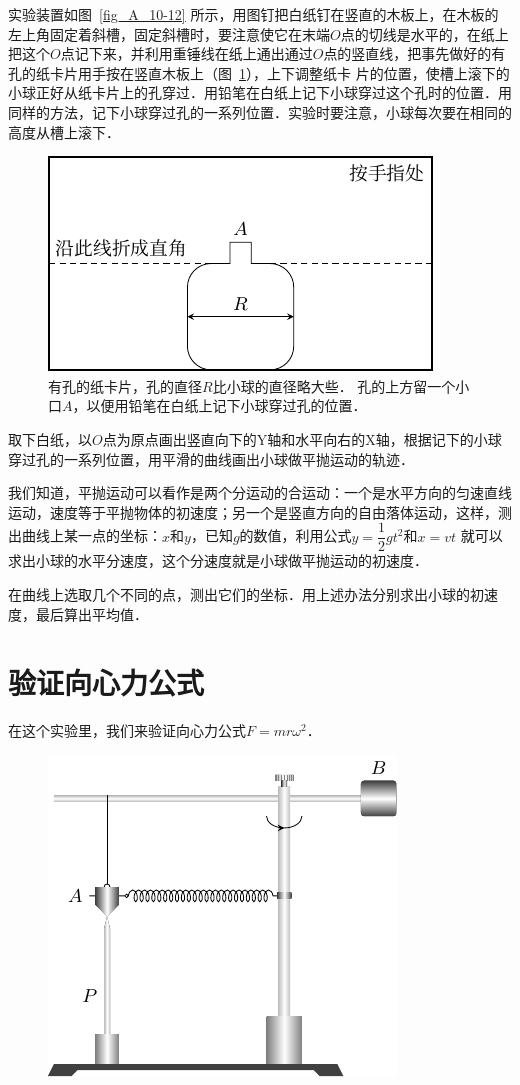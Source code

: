 实验装置如图~\ref{fig_A_10-12} 所示，用图钉把白纸钉在竖直的木板上，在木板的左上角固定着斜槽，固定斜槽时，要注意使它在末端$O$点的切线是水平的，在纸上把这个$O$点记下来，并利用重锤线在纸上通出通过$O$点的竖直线，把事先做好的有孔的纸卡片用手按在竖直木板上（图~\ref{fig_A_10-13}），上下调整纸卡
片的位置，使槽上滚下的小球正好从纸卡片上的孔穿过．用铅笔在白纸上记下小球穿过这个孔时的位置．用同样的方法，记下小球穿过孔的一系列位置．实验时要注意，小球每次要在相同的高度从槽上滚下．
\begin{figure}[htbp]
    \centering
    \includegraphics{fig/A/10-13.pdf}
    \caption{有孔的纸卡片，孔的直径$R$比小球的直径略大些．
    孔的上方留一个小口$A$，以便用铅笔在白纸上记下小球穿过孔的位置．}\label{fig_A_10-13}
\end{figure}

取下白纸，以$O$点为原点画出竖直向下的Y轴和水平向右的X轴，根据记下的小球穿过孔的一系列位置，用平滑的曲线画出小球做平抛运动的轨迹．

我们知道，平抛运动可以看作是两个分运动的合运动：一个是水平方向的匀速直线运动，速度等于平抛物体的初速度；另一个是竖直方向的自由落体运动，这样，测出曲线上某一点的坐标：$x$和$y$，已知$g$的数值，利用公式$y=\dfrac{1}{2}gt^2$和$x=vt$
就可以求出小球的水平分速度，这个分速度就是小球做平抛运动的初速度．

在曲线上选取几个不同的点，测出它们的坐标．用上述办法分别求出小球的初速度，最后算出平均值．

\section{验证向心力公式}
在这个实验里，我们来验证向心力公式$F=mr\omega^2$．
\begin{figure}[htbp]
    \centering
    \includegraphics{fig/A/10-14.pdf}
    \caption{}\label{fig_A_10-14}
\end{figure}

